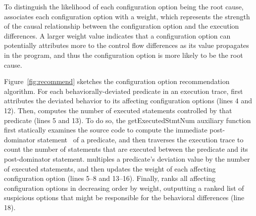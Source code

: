 To distinguish the likelihood of each configuration
option being the root cause, \ourtool associates each
configuration option with a weight, which represents the strength of
the causal relationship between the configuration option
and the execution differences.
A larger weight value indicates that a configuration option
can potentially attributes more to the control
flow differences as its value propagates in the program, and thus
the configuration option is more likely to be the root cause.

Figure~\ref{fig:recommend} sketches the configuration option
recommendation algorithm.
For each behaviorally-deviated predicate in an execution trace,
\ourtool first attributes the deviated behavior
to its affecting configuration options (lines 4 and 12). Then,
\ourtool computes the number of executed statements controlled
by that predicate (lines 5 and 13). To do so, 
the getExecutedStmtNum auxiliary function first statically examines the
source code to compute the immediate post-dominator statement~\cite{Torczon:2007:EC}
of a predicate, and then traverses the execution trace to count
the number of statements that
are executed between the predicate and its post-dominator
statement. 
\ourtool multiples a predicate's deviation value 
by the number of executed statements, and then updates the
weight of each affecting configuration option (lines 5--8
and 13--16).
Finally, \ourtool ranks all affecting configuration options
in decreasing order by weight, outputting a ranked list of suspicious
options that might be responsible for the
behavioral differences (line 18). 

